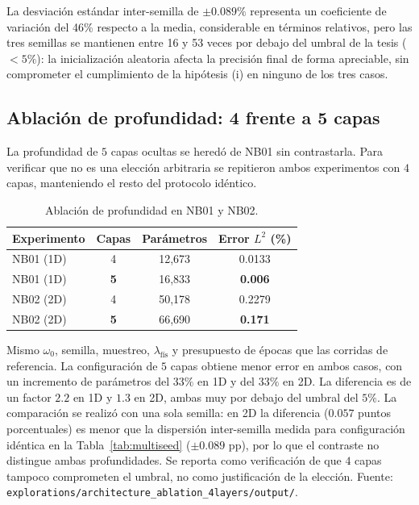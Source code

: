 La desviación estándar inter-semilla de $\pm 0.089\%$ representa un
coeficiente de variación del 46\% respecto a la media, considerable en
términos relativos, pero las tres semillas se mantienen entre 16 y 53 veces
por debajo del umbral de la tesis ($< 5\%$): la inicialización aleatoria
afecta la precisión final de forma apreciable, sin comprometer el
cumplimiento de la hipótesis (i) en ninguno de los tres casos.

\subsection{Ablación de profundidad: 4 frente a 5 capas}
\label{sec:ablacion_capas}

La profundidad de $5$ capas ocultas se heredó de NB01 sin contrastarla. Para
verificar que no es una elección arbitraria se repitieron ambos experimentos con
$4$ capas, manteniendo el resto del protocolo idéntico.

\begin{table}[htbp]
\centering
\begin{threeparttable}
\caption{Ablación de profundidad en NB01 y NB02.}
\label{tab:ablacion_capas}
\begin{tabular}{lccc}
\toprule
Experimento & Capas & Parámetros & Error $L^2$ (\%) \\
\midrule
NB01 (1D) & 4 & 12{,}673 & 0.0133 \\
NB01 (1D) & \textbf{5} & 16{,}833 & \textbf{0.006} \\
\midrule
NB02 (2D) & 4 & 50{,}178 & 0.2279 \\
NB02 (2D) & \textbf{5} & 66{,}690 & \textbf{0.171} \\
\bottomrule
\end{tabular}
\begin{tablenotes}\small
    \item Mismo $\omega_0$, semilla, muestreo, $\lambda_\text{fís}$ y
    presupuesto de épocas que las corridas de referencia. La configuración de
    $5$ capas obtiene menor error en ambos casos, con un incremento de
    parámetros del $33\%$ en 1D y del $33\%$ en 2D. La diferencia es de un
    factor $2.2$ en 1D y $1.3$ en 2D, ambas muy por debajo del umbral del
    $5\%$. La comparación se realizó con una sola semilla: en 2D la diferencia
    ($0.057$ puntos porcentuales) es menor que la dispersión inter-semilla
    medida para configuración idéntica en la Tabla~\ref{tab:multiseed}
    ($\pm0.089$ pp), por lo que el contraste no distingue ambas profundidades.
    Se reporta como verificación de que $4$ capas tampoco comprometen el
    umbral, no como justificación de la elección. Fuente:
    \texttt{explorations/architecture\_ablation\_4layers/output/}.
\end{tablenotes}
\end{threeparttable}
\end{table}

